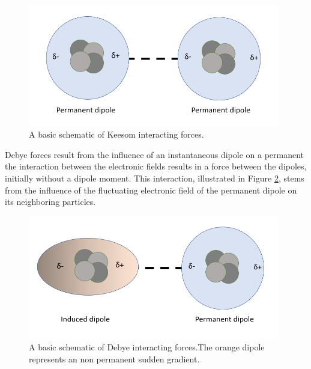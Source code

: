 \begin{figure}[h!!!!!!!!!!!!!!!!!!!!!!!!!]     %
        \begin{center}
          \includegraphics[width=110mm]{chapter1/keesom.PNG}
\end{center}
\caption{A basic schematic of Keesom interacting forces.}
\label{fig:keesom}                 %
\end{figure}

Debye forces result from the influence of an instantaneous dipole on a permanent 
the interaction between the electronic fields results in a force between the dipoles, initially without a dipole moment. This interaction, illustrated in Figure \ref{fig:debye}, stems from the influence of the fluctuating electronic field of the permanent dipole on its neighboring particles.

\begin{figure}[h!]     %
        \begin{center}
          \includegraphics[width=110mm]{chapter1/debye.PNG}
\end{center}
\caption{A basic schematic of Debye interacting forces.The orange dipole represents an non permanent sudden gradient.}
\label{fig:debye}                 %
\end{figure}


